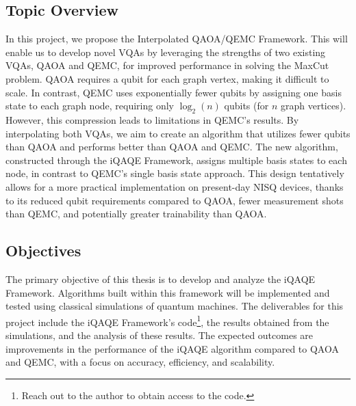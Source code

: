 \subsection{Topic Overview}
\label{section:overview}
In this project, we propose the Interpolated QAOA/QEMC Framework. This will enable us to develop novel VQAs by leveraging the strengths of two existing VQAs, QAOA and QEMC, for improved performance in solving the MaxCut problem. QAOA requires a qubit for each graph vertex, making it difficult to scale. In contrast, QEMC uses exponentially fewer qubits by assigning one basis state to each graph node, requiring only $\log_2(n)$ qubits (for $n$ graph vertices). However, this compression leads to limitations in QEMC's results. By interpolating both VQAs, we aim to create an algorithm that utilizes fewer qubits than QAOA and performs better than QAOA and QEMC. The new algorithm, constructed through the iQAQE Framework, assigns multiple basis states to each node, in contrast to QEMC's single basis state approach. This design tentatively allows for a more practical implementation on present-day NISQ devices, thanks to its reduced qubit requirements compared to QAOA, fewer measurement shots than QEMC, and potentially greater trainability than QAOA.

\subsection{Objectives}
\label{section:objectives}
The primary objective of this thesis is to develop and analyze the iQAQE Framework. Algorithms built within this framework will be implemented and tested using classical simulations of quantum machines. The deliverables for this project include the iQAQE Framework's code\footnote{Reach out to the author to obtain access to the code.}, the results obtained from the simulations, and the analysis of these results. The expected outcomes are improvements in the performance of the iQAQE algorithm compared to QAOA and QEMC, with a focus on accuracy, efficiency, and scalability.